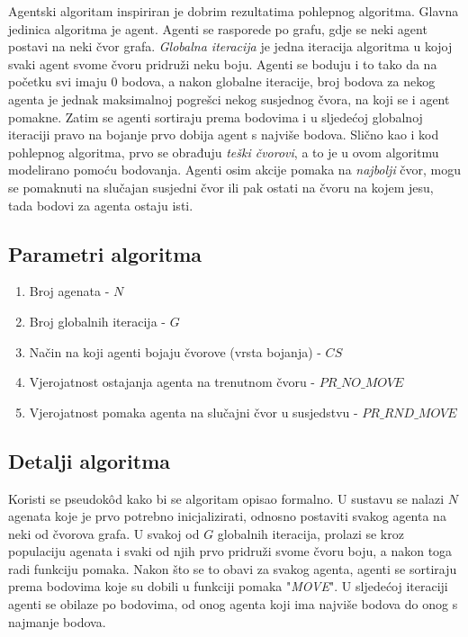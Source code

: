 \documentclass[times, utf8, diplomski, numeric]{fer}
\begin{document}
Agentski algoritam inspiriran je dobrim rezultatima pohlepnog algoritma. Glavna jedinica algoritma je agent. Agenti se rasporede po grafu, gdje se neki agent postavi na neki čvor grafa. \emph{Globalna iteracija} je jedna iteracija algoritma u kojoj svaki agent svome čvoru pridruži neku boju. Agenti se boduju i to tako da na početku svi imaju $0$ bodova, a nakon globalne iteracije, broj bodova za nekog agenta je jednak maksimalnoj pogrešci nekog susjednog čvora, na koji se i agent pomakne. Zatim se agenti sortiraju prema bodovima i u sljedećoj globalnoj iteraciji pravo na bojanje prvo dobija agent s najviše bodova. Slično kao i kod pohlepnog algoritma, prvo se obrađuju \emph{teški čvorovi}, a to je u ovom algoritmu modelirano pomoću bodovanja. Agenti osim akcije pomaka na \emph{najbolji} čvor, mogu se pomaknuti na slučajan susjedni čvor ili pak ostati na čvoru na kojem jesu, tada bodovi za agenta ostaju isti.

\subsection{Parametri algoritma}

\begin{enumerate}
	\item Broj agenata - $N$
	\item Broj globalnih iteracija - $G$
	\item Način na koji agenti bojaju čvorove (vrsta bojanja) - $CS$
	\item Vjerojatnost ostajanja agenta na trenutnom čvoru - $PR\_NO\_MOVE$
	\item Vjerojatnost pomaka agenta na slučajni čvor u susjedstvu - $PR\_RND\_MOVE$
\end{enumerate}

\subsection{Detalji algoritma}

Koristi se pseudok\^{o}d kako bi se algoritam opisao formalno. U sustavu se nalazi $N$ agenata koje je prvo potrebno inicjalizirati, odnosno postaviti svakog agenta na neki od čvorova grafa. U svakoj od $G$ globalnih iteracija, prolazi se kroz populaciju agenata i svaki od njih prvo pridruži svome čvoru boju, a nakon toga radi funkciju pomaka. Nakon što se to obavi za svakog agenta, agenti se sortiraju prema bodovima koje su dobili u funkciji pomaka "\emph{MOVE}". U sljedećoj iteraciji agenti se obilaze po bodovima, od onog agenta koji ima najviše bodova do onog s najmanje bodova.
\end{document}
